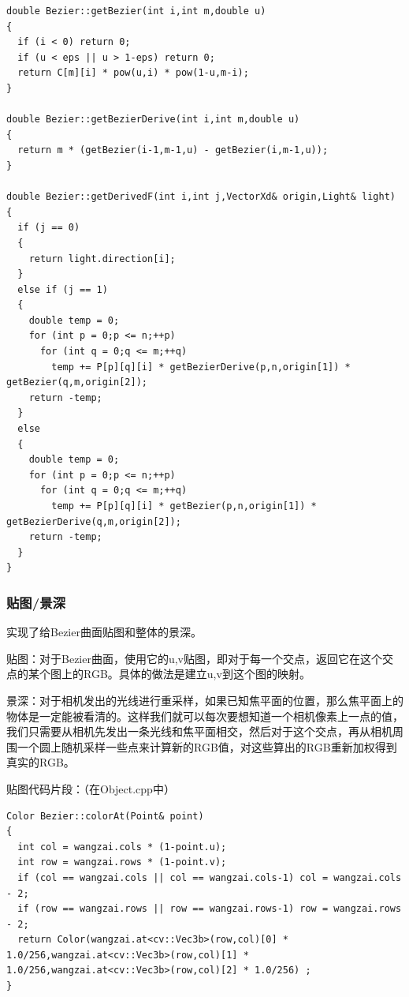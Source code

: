 \documentclass[10pt, a4paper]{article}
\begin{document}
\begin{lstlisting}
double Bezier::getBezier(int i,int m,double u)
{
  if (i < 0) return 0;
  if (u < eps || u > 1-eps) return 0;
  return C[m][i] * pow(u,i) * pow(1-u,m-i);
}

double Bezier::getBezierDerive(int i,int m,double u)
{
  return m * (getBezier(i-1,m-1,u) - getBezier(i,m-1,u));
}

double Bezier::getDerivedF(int i,int j,VectorXd& origin,Light& light)
{
  if (j == 0)
  {
    return light.direction[i];
  }
  else if (j == 1)
  {
    double temp = 0;
    for (int p = 0;p <= n;++p)
      for (int q = 0;q <= m;++q)
        temp += P[p][q][i] * getBezierDerive(p,n,origin[1]) * getBezier(q,m,origin[2]);
    return -temp;
  }
  else 
  {
    double temp = 0;
    for (int p = 0;p <= n;++p)
      for (int q = 0;q <= m;++q)
        temp += P[p][q][i] * getBezier(p,n,origin[1]) * getBezierDerive(q,m,origin[2]);
    return -temp;
  }
}
          \end{lstlisting}
        \subsubsection{贴图/景深}
          实现了给Bezier曲面贴图和整体的景深。

          贴图：对于Bezier曲面，使用它的u,v贴图，即对于每一个交点，返回它在这个交点的某个图上的RGB。具体的做法是建立u,v到这个图的映射。

          景深：对于相机发出的光线进行重采样，如果已知焦平面的位置，那么焦平面上的物体是一定能被看清的。这样我们就可以每次要想知道一个相机像素上一点的值，我们只需要从相机先发出一条光线和焦平面相交，然后对于这个交点，再从相机周围一个圆上随机采样一些点来计算新的RGB值，对这些算出的RGB重新加权得到真实的RGB。

          贴图代码片段：（在Object.cpp中）
          \begin{lstlisting}
Color Bezier::colorAt(Point& point)
{
  int col = wangzai.cols * (1-point.u);
  int row = wangzai.rows * (1-point.v);
  if (col == wangzai.cols || col == wangzai.cols-1) col = wangzai.cols - 2;
  if (row == wangzai.rows || row == wangzai.rows-1) row = wangzai.rows - 2;
  return Color(wangzai.at<cv::Vec3b>(row,col)[0] * 1.0/256,wangzai.at<cv::Vec3b>(row,col)[1] * 1.0/256,wangzai.at<cv::Vec3b>(row,col)[2] * 1.0/256) ;
}
          \end{lstlisting}
\end{document}
